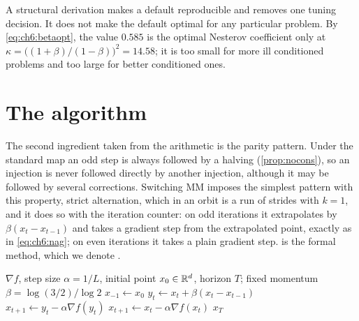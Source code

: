 \begin{remark}\label{rem:ch6:notoptimal}
A structural derivation makes a default reproducible and removes one tuning
decision. It does not make the default optimal for any particular problem. By
\eqref{eq:ch6:betaopt}, the value $0.585$ is the optimal Nesterov coefficient
only at $\kappa=\bigl((1+\beta)/(1-\beta)\bigr)^2=14.58$; it is too small for
more ill conditioned problems and too large for better conditioned ones.
\end{remark}

\section{The algorithm}\label{sec:ch6:alg}

The second ingredient taken from the arithmetic is the parity pattern.
Under the standard map an odd step is always followed by a halving (\cref{prop:nocons}), so an injection is never followed directly by another injection, although it may be followed by several corrections.
Switching MM imposes the simplest pattern with this property, strict alternation, which in an orbit is a run of strides with $k=1$, and it does so with the iteration counter: on odd iterations it extrapolates by $\beta(x_t-x_{t-1})$ and takes a gradient step from the extrapolated point, exactly as in \eqref{eq:ch6:nag}; on even iterations it takes a plain gradient step.
 is the formal method, which we denote \smmdet.

\begin{algorithm}[t]
\caption{\smmdet: Switching MM with deterministic parity injection}
\label{alg:smmdet}
\begin{algorithmic}[1]
\Require $\nabla f$, step size $\alpha=1/L$, initial point $x_0\in\mathbb{R}^d$,
horizon $T$; fixed momentum $\beta=\log(3/2)/\log 2$
\State $x_{-1}\gets x_0$
    \State $y_t\gets x_t+\beta(x_t-x_{t-1})$ 
    \State $x_{t+1}\gets y_t-\alpha\nabla f(y_t)$
  \Else
    \State $x_{t+1}\gets x_t-\alpha\nabla f(x_t)$ 
  \EndIf
\EndFor
\State \Return $x_T$
\end{algorithmic}
\end{algorithm}

